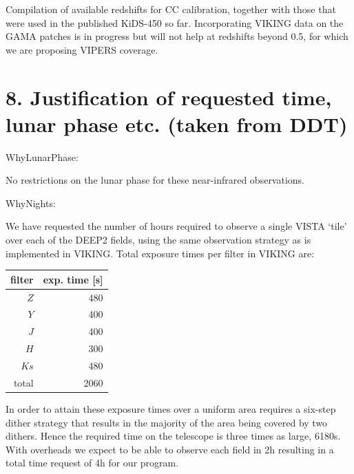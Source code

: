 \documentclass[a4paper, 10pt]{article}
\begin{document}
Compilation of available redshifts for CC calibration, together with those that were used in the published KiDS-450 so far. Incorporating VIKING data on the GAMA patches is in progress but will not help at redshifts beyond 0.5, for which we are proposing VIPERS coverage.



\section*{8. Justification of requested time, lunar phase etc. (taken from DDT)}

WhyLunarPhase: 

No restrictions on the lunar phase for these near-infrared observations.

WhyNights:

We have requested the number of hours required to observe a single VISTA `tile' over each of the DEEP2 fields, using the same observation strategy as is  implemented in VIKING. Total exposure times per filter in VIKING are:

\vspace{0.5cm}
\begin{tabular}{rr}
filter & exp. time [s]\\
\hline
$Z$ & 480\\
$Y$ & 400\\
$J$ & 400\\
$H$ & 300\\
$Ks$ & 480\\
\hline
total & 2060\\
\end{tabular}

\vspace{0.5cm}
In order to attain these exposure times over a uniform area requires a six-step dither strategy that results in the majority of the area being covered by two dithers. Hence the required time on the telescope is three times as large, 6180s. With overheads we expect to be able to observe each field in 2h resulting in a total time request of 4h for our program.
\end{document}
